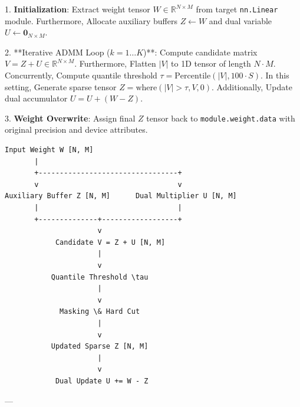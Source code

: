 1. \textbf{Initialization}:
Extract weight tensor $W \in \mathbb{R}^{N \times M}$ from target \texttt{nn.Linear} module. Furthermore, Allocate auxiliary buffers $Z \leftarrow W$ and dual variable $U \leftarrow \mathbf{0}_{N \times M}$.

2. **Iterative ADMM Loop ($k = 1 \dots K$)**:
Compute candidate matrix $V = Z + U \in \mathbb{R}^{N \times M}$. Furthermore, Flatten $|V|$ to 1D tensor of length $N \cdot M$. Concurrently, Compute quantile threshold $\tau = \text{Percentile}(|V|, 100 \cdot S)$. In this setting, Generate sparse tensor $Z = \text{where}(|V| > \tau, V, 0)$. Additionally, Update dual accumulator $U = U + (W - Z)$.

3. \textbf{Weight Overwrite}:
Assign final $Z$ tensor back to \texttt{module.weight.data} with original precision and device attributes.



\begin{lstlisting}
Input Weight W [N, M]
       |
       +---------------------------------+
       v                                 v
Auxiliary Buffer Z [N, M]      Dual Multiplier U [N, M]
       |                                 |
       +--------------+------------------+
                      v
            Candidate V = Z + U [N, M]
                      |
                      v
           Quantile Threshold \tau 
                      |
                      v
             Masking \& Hard Cut
                      |
                      v
           Updated Sparse Z [N, M]
                      |
                      v
            Dual Update U += W - Z
\end{lstlisting}


---